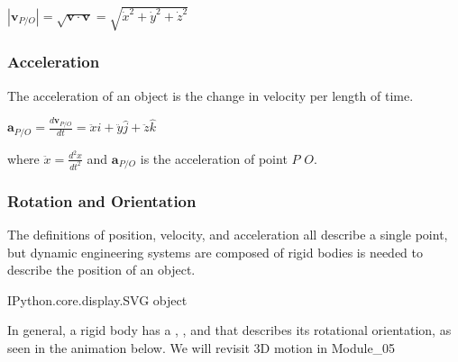 \documentclass[letterpaper,10pt,english]{sphinxmanual}
\begin{document}
\(|\mathbf{v}_{P/O}| = \sqrt{\mathbf{v}\cdot\mathbf{v}} =
\sqrt{\dot{x}^2 + \dot{y}^2 + \dot{z}^2}\)


\subsubsection{Acceleration}
\label{\detokenize{module_01/kinematics:acceleration}}
The acceleration of an object is the change in velocity per length of
time.

\(\mathbf{a}_{P/O} = \frac{d \mathbf{v}_{P/O} }{dt} = \ddot{x}\hat{i} +
\ddot{y}\hat{j} + \ddot{z}\hat{k}\)

where \(\ddot{x}=\frac{d^2 x}{dt^2}\) and \(\mathbf{a}_{P/O}\) is the
acceleration of point \(P\)  \(O\).


\subsubsection{Rotation and Orientation}
\label{\detokenize{module_01/kinematics:rotation-and-orientation}}
The definitions of position, velocity, and acceleration all describe a
single point, but dynamic engineering systems are composed of rigid
bodies is needed to describe the position of an object.

\begin{sphinxVerbatim}[commandchars=\\\{\}]
   

\end{sphinxVerbatim}

\begin{sphinxVerbatim}[commandchars=\\\{\}]
\PYGZlt{}IPython.core.display.SVG object\PYGZgt{}
\end{sphinxVerbatim}


In general, a rigid body has a , , and  that describes
its rotational orientation, as seen in the animation below. We will
revisit 3D motion in Module\_05
\end{document}
